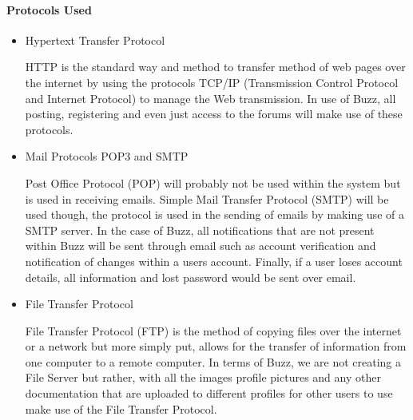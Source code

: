 \documentclass[10pt]{article}
\begin{document}
\paragraph{Protocols Used}
\begin{itemize}
\item Hypertext Transfer Protocol

HTTP is the standard way and method to transfer method of web pages over the internet by using the protocols TCP/IP (Transmission Control Protocol and Internet Protocol) to manage the Web transmission. In use of Buzz, all posting, registering and even just access to the forums will make use of these protocols.

\item Mail Protocols POP3 and SMTP

Post Office Protocol (POP) will probably not be used within the system but is used in receiving emails. Simple Mail Transfer Protocol (SMTP) will be used though, the protocol is used in the sending of emails by making use of a SMTP server. In the case of Buzz, all notifications that are not present within Buzz will be sent through email such as account verification and notification of changes within a users account. Finally, if a user loses account details, all information and lost password would be sent over email.

\item File Transfer Protocol

File Transfer Protocol (FTP) is the method of copying files over the internet or a network but more simply put, allows for the transfer of information from one computer to a remote computer. In terms of Buzz, we are not creating a File Server but rather, with all the images profile pictures and any other documentation that are uploaded to different profiles for other users to use make use of the File Transfer Protocol.

\end{itemize}




\clearpage
\end{document}
